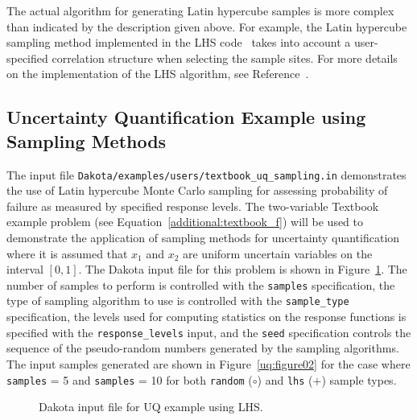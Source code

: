 The actual algorithm for generating Latin hypercube samples is more
complex than indicated by the description given above. For example,
the Latin hypercube sampling method implemented in the LHS
code~\cite{Swi04} takes into account a user-specified correlation
structure when selecting the sample sites. For more details on the
implementation of the LHS algorithm, see Reference~\cite{Swi04}.

\subsection{Uncertainty Quantification Example using Sampling Methods}\label{uq:uncertainty1}

The input file \texttt{Dakota/examples/users/textbook\_uq\_sampling.in}
demonstrates the use of Latin hypercube Monte Carlo sampling for
assessing probability of failure as measured by specified response
levels.  The two-variable Textbook example problem (see
Equation~\ref{additional:textbook_f}) will be used to demonstrate
the application of sampling methods for uncertainty quantification
where it is assumed that $x_1$ and $x_2$ are uniform uncertain
variables on the interval $[0,1]$. The Dakota input file for this
problem is shown in Figure~\ref{uq:figure01}. 
The number of samples to
perform is controlled with the \texttt{samples} specification, the
type of sampling algorithm to use is controlled with the
\texttt{sample\_type} specification, the levels used for computing
statistics on the response functions is specified with the
\texttt{response\_levels} input, and the \texttt{seed} specification
controls the sequence of the pseudo-random numbers generated by the
sampling algorithms. The input samples generated are shown in
Figure~\ref{uq:figure02} for the case where \texttt{samples} = 5 and
\texttt{samples} = 10 for both \texttt{random} ($\circ$) and 
\texttt{lhs} ($+$) sample types.

\begin{figure}
  \centering \begin{bigbox} \begin{small}
   \end{small} \end{bigbox}
\caption{Dakota input file for UQ example using LHS.}
\label{uq:figure01}
\end{figure}

